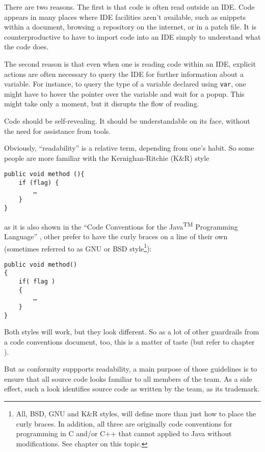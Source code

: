 There are two reasons. The first is that code is often read outside an IDE. Code appears in many places where IDE facilities aren’t available, such as snippets within a document, browsing a repository on the internet, or in a patch file. It is counterproductive to have to import code into an IDE simply to understand what the code does.

The second reason is that even when one is reading code within an IDE, explicit actions are often necessary to query the IDE for further information about a variable. For instance, to query the type of a variable declared using \lstinline|var|, one might have to hover the pointer over the variable and wait for a popup. This might take only a moment, but it disrupts the flow of reading.

Code should be self-revealing. It should be understandable on its face, without the need for assistance from tools.

Obviously, “readability” is a relative term, depending from one's habit. So some people are more familiar with the Kernighan-Ritchie (K\&R) style

\begin{lstlisting}
public void method (){
    if (flag) {
        …
    }
}
\end{lstlisting}

as it is also shown in the “Code Conventions for the Java\textsuperscript{TM} Programming Language” \autocite{SUN_CODE_CONVENTIONS}, other prefer to have the curly braces on a line of their own (sometimes referred to as GNU or BSD style\footnote{All, BSD, GNU and K\&R styles, will define more than just how to place the curly braces. In addition, all three are originally code conventions for programming in C and/or C++ that cannot applied to Java without modifications. See chapter  on this topic.}):

\begin{lstlisting}
public void method()
{
    if( flag )
    {
    	…
    }
}
\end{lstlisting}

Both styles will work, but they look different. So as a lot of other guardrails from a code conventions document, too, this is a matter of taste (but refer to chapter ).

But as conformity suppports readability, a main purpose of those guidelines is to ensure that all source code looks familiar to all members of the team. As a side effect, such a look identifies source code as written by the team, as its trademark.

